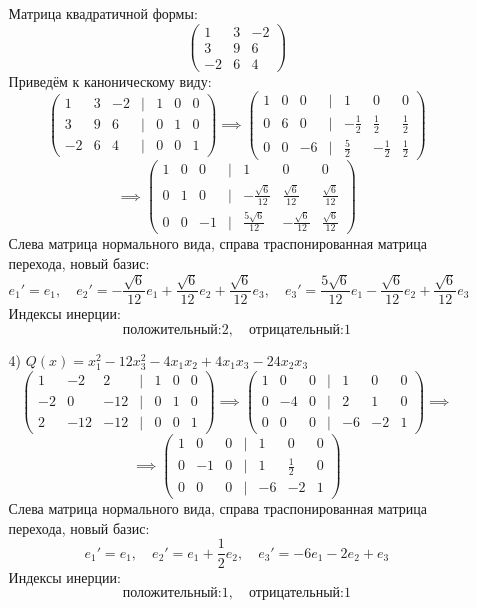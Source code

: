 \documentclass[a4paper]{article}
\newcommand{\mat}[1]{\begin{pmatrix} #1 \end{pmatrix}}
\renewcommand{\f}[2]{\frac{#1}{#2}}
\begin{document}
\begin{enumerate}
\begin{enumerate}
        Матрица квадратичной формы:
        \[
        \begin{pmatrix}
        1 & 3 & -2 \\
        3 & 9 & 6 \\
        -2 & 6 & 4
        \end{pmatrix}
        \] 
        Приведём к каноническому виду:
        $$\mat{
            1&3&-2&|&1&0&0\\
            3&9&6&|&0&1&0\\
            -2&6&4&|&0&0&1
        }\implies\mat{
            1&0&0&|&1&0&0\\
            0&6&0&|&-\f{1}{2}&\f{1}{2}&\f{1}{2}\\
            0&0&-6&|&\f{5}{2}&-\f{1}{2}&\f{1}{2}
        }$$
        $$\implies \begin{pmatrix}
            1 & 0 & 0 & \big| & 1 & 0 & 0 \\
            0 & 1 & 0 & \big| & -\frac{\sqrt{6}}{12} & \frac{\sqrt{6}}{12} & 
            \frac{\sqrt{6}}{12} \\
            0 & 0 & -1 & \big| & \frac{5\sqrt{6}}{12} & -\frac{\sqrt{6}}{12} &
             \frac{\sqrt{6}}{12}
            \end{pmatrix}$$
        Слева матрица нормального вида, справа траспонированная матрица перехода, новый базис:
        $$e_1' = e_1, \quad
        e_2' =-\frac{\sqrt{6}}{12} e_1+\frac{\sqrt{6}}{12}e_2 + \frac{\sqrt{6}}{12}e_3, \quad
        e_3' = \frac{5\sqrt{6}}{12}e_1-\frac{\sqrt{6}}{12}e_2+\frac{\sqrt{6}}{12}e_3$$
        Индексы инерции:
        $$\text{положительный:} 2, \quad \text{отрицательный:} 1$$
        
        \item[4)]  $Q(x) = x_1^2-12x_3^2-4x_1x_2+4x_1x_3-24x_2x_3$
        $$\mat{
            1 & -2 & 2&| & 1 & 0 & 0\\
            -2 & 0 & -12 & | & 0 & 1 & 0\\
            2 & -12 & -12 & | & 0 & 0 & 1
        } \implies \mat{
            1 & 0 & 0&| & 1 & 0 & 0\\
            0 & -4 & 0 & | & 2 & 1 & 0\\
            0 & 0 & 0 & | & -6 & -2 & 1
        }\implies $$
        $$\implies\mat{
            1 & 0 & 0&| & 1 & 0 & 0\\
            0 & -1 & 0 & | & 1 & \f{1}{2} & 0\\
            0 & 0 & 0 & | & -6 & -2 & 1
        }$$
        Слева матрица нормального вида, справа траспонированная матрица перехода, новый базис:
        $$e_1' = e_1, \quad
        e_2' = e_1+\f{1}{2}e_2, \quad
         e_3' = -6e_1-2e_2+e_3$$
        Индексы инерции:
        $$\text{положительный:} 1, \quad \text{отрицательный:} 1$$
    \end{enumerate}
    
\end{enumerate}
\end{document}
